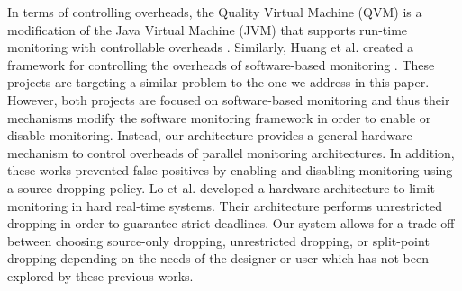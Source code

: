In terms of controlling overheads, the Quality Virtual Machine (QVM) is a
modification of the Java Virtual Machine (JVM) that supports run-time
monitoring with controllable overheads \cite{qvm-oopsla08}. Similarly, Huang et
al. created a framework for controlling the overheads of software-based
monitoring \cite{huang-sttt12}. These projects are targeting a similar problem
to the one we address in this paper. However, both projects are focused on
software-based monitoring and thus their mechanisms modify the software
monitoring framework in order to enable or disable monitoring. Instead, our
architecture provides a general hardware mechanism to control overheads of
parallel monitoring architectures. In addition, these works prevented
false positives by enabling and disabling monitoring using a source-dropping
policy. Lo et al. \cite{lo-rtas14} developed a hardware architecture to limit
monitoring in hard real-time systems. Their architecture performs unrestricted 
dropping in order to guarantee strict deadlines. Our system allows for a
trade-off between choosing source-only dropping, unrestricted dropping, or split-point 
dropping depending on the needs of the designer or user which has not been
explored by these previous works. 
